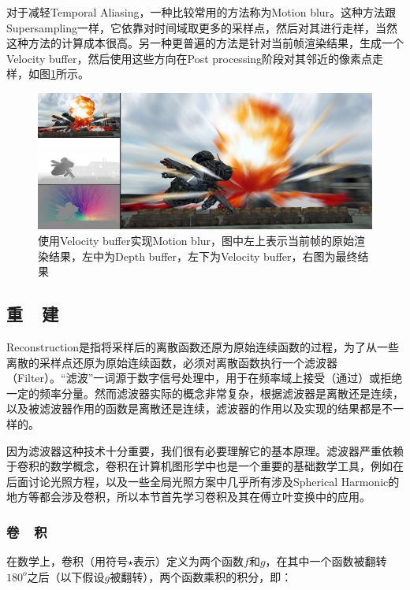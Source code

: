 对于减轻Temporal Aliasing，一种比较常用的方法称为Motion blur。这种方法跟Supersampling一样，它依靠对时间域取更多的采样点，然后对其进行走样，当然这种方法的计算成本很高。另一种更普遍的方法是针对当前帧渲染结果，生成一个Velocity buffer\cite{a:AReconstructionFilterforPlausibleMotionBlur}，然后使用这些方向在Post processing阶段对其邻近的像素点走样，如图\ref{f:intro-motion-blur}所示。

\begin{figure}
	\includegraphics[width=1.\textwidth]{figures/intro/motion-blur}
	\caption{使用Velocity buffer实现Motion blur，图中左上表示当前帧的原始渲染结果，左中为Depth buffer，左下为Velocity buffer，右图为最终结果}
	\label{f:intro-motion-blur}
\end{figure}





\subsection{重~~建}\label{sec:intro-reconstruction}
Reconstruction是指将采样后的离散函数还原为原始连续函数的过程，为了从一些离散的采样点还原为原始连续函数，必须对离散函数执行一个滤波器（Filter）。“滤波”一词源于数字信号处理中，用于在频率域上接受（通过）或拒绝一定的频率分量。然而滤波器实际的概念非常复杂，根据滤波器是离散还是连续，以及被滤波器作用的函数是离散还是连续，滤波器的作用以及实现的结果都是不一样的。

因为滤波器这种技术十分重要，我们很有必要理解它的基本原理。滤波器严重依赖于卷积的数学概念，卷积在计算机图形学中也是一个重要的基础数学工具，例如在后面讨论光照方程，以及一些全局光照方案中几乎所有涉及Spherical Harmonic的地方等都会涉及卷积，所以本节首先学习卷积及其在傅立叶变换中的应用。



\subsubsection{卷~~积}
在数学上，卷积（用符号$\star$表示）定义为两个函数$f$和$g$，在其中一个函数被翻转$180^{o}$之后（以下假设$g$被翻转），两个函数乘积的积分，即：

